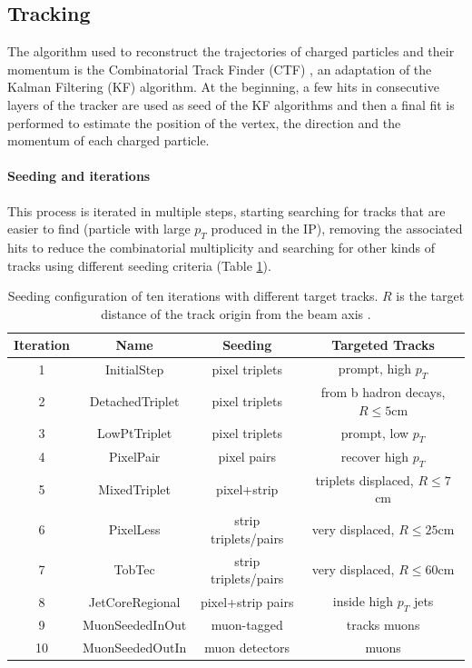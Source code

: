\subsection{Tracking}\label{sec:tracking}
The algorithm used to reconstruct the trajectories of charged particles and their momentum is the Combinatorial Track Finder (CTF) \cite{Chatrchyan2014DescriptionTracker}, an adaptation of the Kalman Filtering (KF) \cite{Fruhwirth1987ApplicationFitting} algorithm.
At the beginning, a few hits in consecutive layers of the tracker are used as seed of the KF algorithms and then a final fit is performed to estimate the position of the vertex, the direction and the momentum of each charged particle.\\

\paragraph*{Seeding and iterations}
This process is iterated in multiple steps, starting searching for tracks that are easier to find (\eg particle with large $p_T$ produced in the IP), removing the associated hits to reduce the combinatorial multiplicity and searching for other kinds of tracks using different seeding criteria (Table \ref{tab:track_seeding}).

\begin{table}[h!]
    \centering
    \begin{tabular}{|c|c|c|c|}
    \hline
    Iteration&Name&Seeding&Targeted Tracks\\
    \hline
    1& InitialStep&pixel triplets&prompt, high $p_T$\\
    2& DetachedTriplet&pixel triplets&from b hadron decays, $R\leq 5$cm\\
    3& LowPtTriplet&pixel triplets&prompt, low $p_T$\\
    4& PixelPair&pixel pairs&recover high $p_T$\\
    5& MixedTriplet&pixel+strip&triplets displaced, $R\leq 7$cm\\
    6& PixelLess&strip triplets/pairs&very displaced, $R\leq 25$cm\\
    7& TobTec&strip triplets/pairs&very displaced, $R\leq 60$cm\\
    8& JetCoreRegional&pixel+strip pairs&inside high $p_T$ jets\\
    9& MuonSeededInOut&muon-tagged&tracks muons\\
    10& MuonSeededOutIn&muon detectors&muons \\
    \hline
    \end{tabular}
    \caption{Seeding configuration of ten iterations with different target tracks. $R$ is the target distance of the track origin from the beam axis \cite{Sirunyan2017Particle-flowDetector}. }
    \label{tab:track_seeding}
\end{table}

